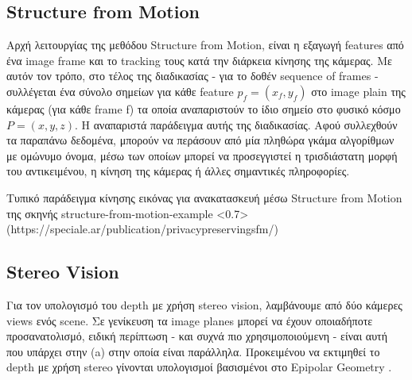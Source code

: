 \subsection{Structure from Motion} \label{sec:theo-structure-from-motion}
Αρχή λειτουργίας της μεθόδου Structure from Motion, είναι η εξαγωγή features από ένα image frame και το tracking τους κατά την διάρκεια κίνησης της κάμερας. Με αυτόν τον τρόπο, στο τέλος της διαδικασίας - για το δοθέν sequence of frames - συλλέγεται ένα σύνολο σημείων για κάθε feature $p_{f} = (x_{f}, y_{f})$ στο image plain της κάμερας (για κάθε frame f) τα οποία αναπαριστούν το ίδιο σημείο στο φυσικό κόσμο $P = (x,y,z)$. Η  αναπαριστά παράδειγμα αυτής της διαδικασίας. Αφού συλλεχθούν τα παραπάνω δεδομένα, μπορούν να περάσουν από μία πληθώρα γκάμα αλγορίθμων με ομώνυμο όνομα, μέσω των οποίων μπορεί να προσεγγιστεί η τρισδιάστατη μορφή του αντικειμένου, η κίνηση της κάμερας ή άλλες σημαντικές πληροφορίες.

%
{Τυπικό παράδειγμα κίνησης εικόνας για ανακατασκευή μέσω Structure from Motion της σκηνής}%
{structure-from-motion-example}%
<0.7>%
(https://speciale.ar/publication/privacypreservingsfm/)


\subsection{Stereo Vision} \label{sec:theo-stereo}
Για τον υπολογισμό του depth με χρήση stereo vision, λαμβάνουμε από δύο κάμερες views ενός scene. Σε γενίκευση τα image planes μπορεί να έχουν οποιαδήποτε προσανατολισμό, ειδική περίπτωση - και συχνά πιο χρησιμοποιούμενη - είναι αυτή που υπάρχει στην  (a) στην οποία είναι παράλληλα. Προκειμένου να εκτιμηθεί το depth με χρήση stereo γίνονται υπολογισμοί βασισμένοι στο Epipolar Geometry \cite{wiki-epipolar-geometry}.

